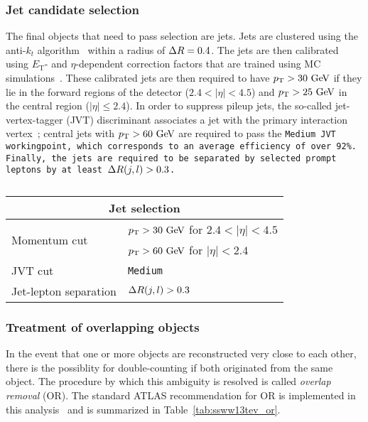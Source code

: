 

\subsubsection{Jet candidate selection}
The final objects that need to pass selection are jets.
Jets are clustered using the anti-$k_t$ algorithm~\cite{2008.antikt} within a radius of $\Delta R = 0.4$.
The jets are then calibrated using $E_\textrm{T}$- and $\eta$-dependent correction factors that are trained using MC simulations~\cite{2017.jet-energy-scale-13tev}.
These calibrated jets are then required to have $\pt > 30\gev$ if they lie in the forward regions of the detector ($2.4 < |\eta| < 4.5$) and $\pt > 25\gev$ in the central region ($|\eta| \le 2.4$).
In order to suppress pileup jets, the so-called jet-vertex-tagger (JVT) discriminant associates a jet with the primary interaction vertex~\cite{2014.jet-vertex-tagger}; central jets with $\pt > 60\gev$ are required to pass the \tt{Medium} JVT workingpoint, which corresponds to an average efficiency of over 92\%. %
Finally, the jets are required to be separated by selected prompt leptons by at least $\Delta R(j,l) > 0.3$.

\begin{table}[htbp]
  \centering
  \begin{tabular}{l l}
    \multicolumn{2}{c}{Jet selection} \\ 
    \hline\hline
    \multirow{2}{*}{Momentum cut} & $\pt > 30\gev$ for $2.4 < |\eta| < 4.5$ \\
                                  & $\pt > 60\gev$ for $|\eta| < 2.4$ \\
    JVT cut                       & \tt{Medium}\\
    Jet-lepton separation         & $\Delta R(j,l) > 0.3$ \\
    \hline
  \end{tabular}
  \caption{}
  \label{tab:ssww13tev_jet_selection}
\end{table}

\subsubsection{Treatment of overlapping objects}\label{ssww13tev:overlap_removal}
In the event that one or more objects are reconstructed very close to each other, there is the possiblity for double-counting if both originated from the same object.
The procedure by which this ambiguity is resolved is called \emph{overlap removal} (OR).
The standard ATLAS recommendation for OR is implemented in this analysis~\cite{2014.atlas-overlap-removal, 2018.atlas-wboson-top} and is summarized in Table~\ref{tab:ssww13tev_or}.

